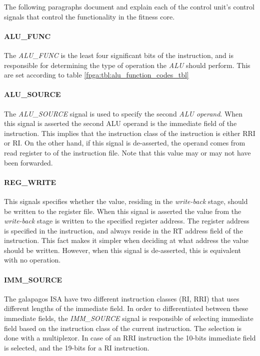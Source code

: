 The following paragraphs document and explain each of the control unit's control signals that control the functionality in the fitness core.

\paragraph{ALU\_FUNC}
The \emph{ALU\_FUNC} is the least four significant bits of the instruction, and is responsible for determining the type of operation the \emph{ALU} should perform. This are set according to table \ref{fpga:tbl:alu_function_codes_tbl} 




\paragraph{ALU\_SOURCE}
The \emph{ALU\_SOURCE} signal is used to specify the second \emph{ALU operand}. When this signal is asserted the second ALU operand is the immediate field of the instruction. This implies that the instruction class of the instruction is either RRI or RI. On the other hand, if this signal is de-asserted, the operand comes from read register to of the instruction file. Note that this value may or may not have been forwarded. 

\paragraph{REG\_WRITE}
This signals specifies whether the value, residing in the \emph{write-back} stage, should be written to the register file. When this signal is asserted the value from the \emph{write-back} stage is written to the specified register address. The register address is specified in the instruction, and always reside in the RT address field of the instruction. This fact makes it simpler when deciding at what address the value should be written. However, when this signal is de-asserted, this is equivalent with no operation. 

\paragraph{IMM\_SOURCE}
The galapagos ISA have two different instruction classes (RI, RRI) that uses different lengths of the immediate field. In order to differentiated between these immediate fields, the \emph{IMM\_SOURCE} signal is responsible of selecting immediate field based on the instruction class of the current instruction. The selection is done with a multiplexor. In case of an RRI instruction the 10-bits immediate field is selected, and the 19-bits for a RI instruction.   


